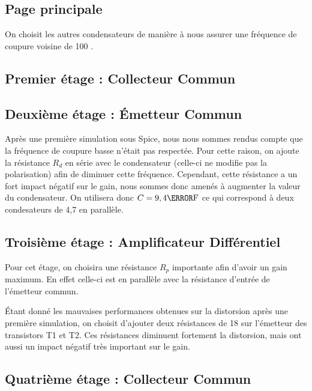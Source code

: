 \documentclass[11pt;a4paper]{report}
\begin{document}
   \subsection{Page principale}
    On choisit les autres condensateurs de manière à nous assurer une fréquence de coupure voisine de 100 \hertz.

   \subsection{Premier étage : Collecteur Commun}

   \subsection{Deuxième étage : Émetteur Commun}

    Après une première simulation sous Spice, nous nous sommes rendus compte que la fréquence de coupure basse n'était pas respectée.
    Pour cette raison, on ajoute la résistance $R_d$ en série avec le condensateur (celle-ci ne modifie pas la polarisation) afin de diminuer cette fréquence.
    Cependant, cette résistance a un fort impact négatif sur le gain, nous sommes donc amenés à augmenter la valeur du condensateur. On utilisera donc $C=9,4 \micro\farad$  ce qui correspond à deux condesateurs de 4,7 \micro\farad  en parallèle.

   \subsection{Troisième étage : Amplificateur Différentiel}

    Pour cet étage, on choisira une résistance $R_p$ importante afin d'avoir un gain maximum.
    En effet celle-ci est en parallèle avec la résistance d'entrée de l'émetteur commun.

    Étant donné les mauvaises performances obtenues sur la distorsion après une première simulation, on choisit d'ajouter deux résistances de 18 \ohm  sur l'émetteur des transistors T1 et T2. Ces résistances diminuent fortement la distorsion, mais ont aussi un impact négatif très important sur le gain.

   \subsection{Quatrième étage : Collecteur Commun}
\end{document}
